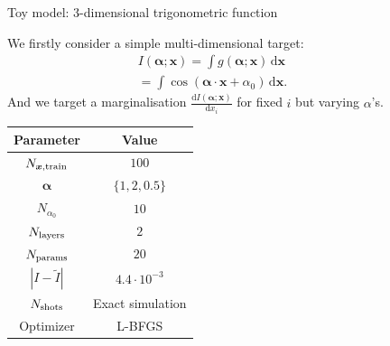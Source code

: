 \documentclass[8pt, xcolor={svgnames}, hyperref={linkcolor=black}]{beamer}
\begin{document}
\begin{frame}{Toy model: $3$-dimensional trigonometric function}
\begin{multicols}{2}

We firstly consider a simple multi-dimensional target:
\begin{equation}
\begin{split}
I(\bm{\alpha}; \bm{x}) = \int g(\bm{\alpha}; \bm{x}) \, \text{d}\bm{x}
\qquad \quad \,\,\,\, \\ = \int \cos (\bm{\alpha} \cdot \bm{x} + \alpha_0) \,\text{d}\bm{x}.
\label{eq:cos_int}
\end{split}
\end{equation}
And we target a marginalisation 
$\frac{\text{d}I(\bm{\alpha}; \bm{x})}{\text{d}x_i}$ for fixed $i$ but varying $\alpha$'s. 
\pause


\begin{table}
\small
\begin{tabular}{cc}
\hline \hline
\textbf{Parameter} & \textbf{Value} \\
\hline
$N_{\bm{x}, \rm train}$ & $100$ \\
$\bm{\alpha}$ & $\{1, 2, 0.5\}$ \\
$N_{\alpha_0}$ & $10$ \\
$N_{\rm layers}$ & $2$ \\
$N_{\rm params}$ & $20$ \\ 
$|I - \tilde{I}|$ & $4.4 \cdot 10^{-3}$ \\
$N_{\rm shots}$ & Exact simulation \\
Optimizer & L-BFGS \\
\hline \hline 
\end{tabular}
\end{table}
\end{multicols}
\pause


\end{frame}
\end{document}
